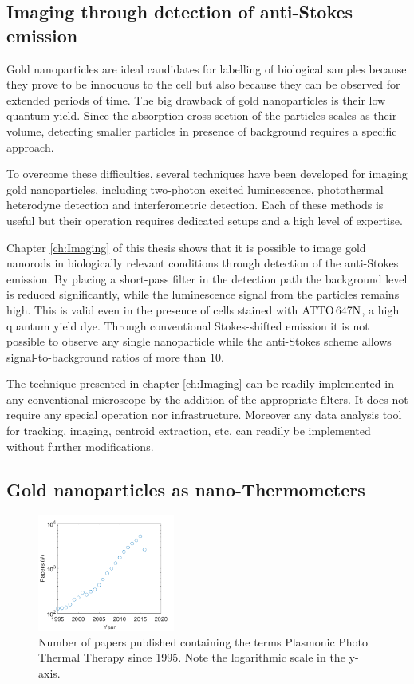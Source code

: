 \subsection{Imaging through detection of anti-Stokes emission}
Gold nanoparticles are ideal candidates for labelling of biological samples
because they prove to be innocuous to the cell but also because they can be
observed for extended periods of time. The big drawback of gold nanoparticles is
their low quantum yield. Since the absorption cross section of the particles
scales as their volume, detecting smaller particles in presence of background
requires a specific approach.

To overcome these difficulties, several techniques have been developed for
imaging gold nanoparticles, including two-photon excited luminescence,
photothermal heterodyne detection and interferometric detection. Each of these
methods is useful but their operation requires dedicated setups and a high
level of expertise. 

Chapter \ref{ch:Imaging} of this thesis shows that it is possible to image gold
nanorods in biologically relevant conditions through detection of the
anti-Stokes emission. By placing a short-pass filter in the detection path the
background level is reduced significantly, while the luminescence signal from
the particles remains high. This is valid even in the presence of cells stained
with $\textrm{ATTO}\,647\textrm{N}$, a high quantum yield dye. Through conventional Stokes-shifted
emission it is not possible to observe any single nanoparticle while the
anti-Stokes scheme allows signal-to-background ratios of more than $10$.

The technique presented in chapter \ref{ch:Imaging} can be readily implemented
in any conventional microscope by the addition of the appropriate filters. It
does not require any special operation nor infrastructure. Moreover any data
analysis tool for tracking, imaging, centroid extraction, etc. can readily be
implemented without further modifications. 

\subsection{Gold nanoparticles as nano-Thermometers}
\begin{figure}[htp]
 \centering
 \includegraphics[width=0.40\textwidth]{Chapters/01_Introduction/Figures/paper_PT_therapy.png}
 \caption{Number of papers published containing the terms Plasmonic Photo
 Thermal Therapy since 1995. Note the logarithmic scale in the y-axis.}
 \label{fig:PPTT}
\end{figure}

